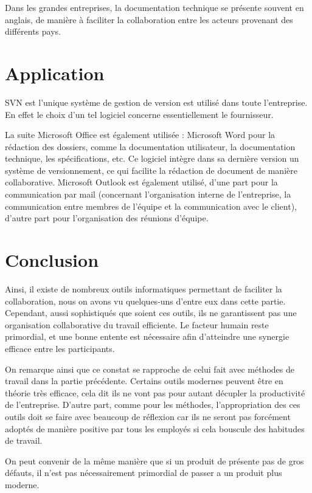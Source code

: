 Dans les grandes entreprises, la documentation technique se présente souvent en anglais, de manière à faciliter la collaboration entre les acteurs provenant des différents pays.

\section{Application}

SVN est l'unique système de gestion de version est utilisé dans toute l'entreprise. En effet le choix d'un tel logiciel concerne essentiellement le fournisseur.

La suite Microsoft Office est également utilisée :
Microsoft Word pour la rédaction des dossiers, comme la documentation utilisateur, la documentation technique, les spécifications, etc. Ce logiciel intègre dans sa dernière version un système de versionnement, ce qui facilite la rédaction de document de manière collaborative.
Microsoft Outlook est également utilisé, d'une part pour la communication par mail (concernant l'organisation interne de l'entreprise, la communication entre membres de l'équipe et la communication avec le client), d'autre part pour l'organisation des réunions d'équipe.

\section{Conclusion}

Ainsi, il existe de nombreux outils informatiques permettant de faciliter la collaboration, nous on avons vu quelques-uns d'entre eux dans cette partie. Cependant, aussi sophistiqués que soient ces outils, ils ne garantissent pas une organisation collaborative du travail efficiente. Le facteur humain reste primordial, et une bonne entente est nécessaire afin d’atteindre une synergie efficace entre les participants.

On remarque ainsi que ce constat se rapproche de celui fait avec méthodes de travail dans la partie précédente. Certains outils modernes peuvent être en théorie très efficace, cela dit ils ne vont pas pour autant décupler la productivité de l'entreprise. D'autre part, comme pour les méthodes, l'appropriation des ces outils doit se faire avec beaucoup de réflexion car ils ne seront pas forcément adoptés de manière positive par tous les employés si cela bouscule des habitudes de travail.

On peut convenir de la même manière que si un produit de présente pas de gros défauts, il n'est pas nécessairement primordial de passer a un produit plus moderne.
